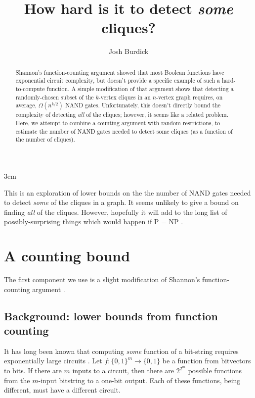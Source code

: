 \documentclass[12pt]{article}
\theoremstyle{definition}
\begin{document}
\emergencystretch 3em
\title{How hard is it to detect {\em some} cliques?}

\author{Josh Burdick}

\maketitle

\begin{abstract}
Shannon's function-counting argument
\cite{shannon_synthesis_1949} showed that most Boolean functions have
exponential circuit complexity, but doesn't provide a specific example
of such a hard-to-compute function. A simple modification of that argument
shows that detecting a randomly-chosen subset of the $k$-vertex cliques in an
$n$-vertex graph requires, on average, $\Omega(n^{k/2})$ NAND gates.
Unfortunately,
this doesn't directly bound the complexity of detecting {\em all} of the cliques;
however, it seems like a related problem.
Here, we attempt to combine a counting argument with
random restrictions, to estimate the number
of NAND gates needed to detect some cliques (as a function
of the number of cliques).
\end{abstract}

\newpage

\tableofcontents

\vspace{5mm}

This is an exploration of lower bounds on the the number of NAND gates
needed to detect {\em some} of the cliques in a graph.
It seems unlikely to give a bound on finding {\em all} of the cliques.
However, hopefully
it will add to the long list of possibly-surprising things which would happen
if P = NP \cite{fenner1996complexity}.

\section{A counting bound}
\label{countingBound}

The first component we use is a slight modification
of Shannon's function-counting argument
\cite{shannon_synthesis_1949}.

\subsection{Background: lower bounds from function counting}

It has long been known that computing {\em some} function of a bit-string
requires exponentially large circuits \cite{shannon_synthesis_1949}.
Let $f: \{0,1\}^m \rightarrow \{0,1\}$ be a function from bitvectors to bits.
If there are $m$ inputs to a circuit,
then there are $2^{2^m}$ possible functions from the $m$-input bitstring to
a one-bit output.
Each of these functions, being different, must have a
different circuit.
\end{document}
